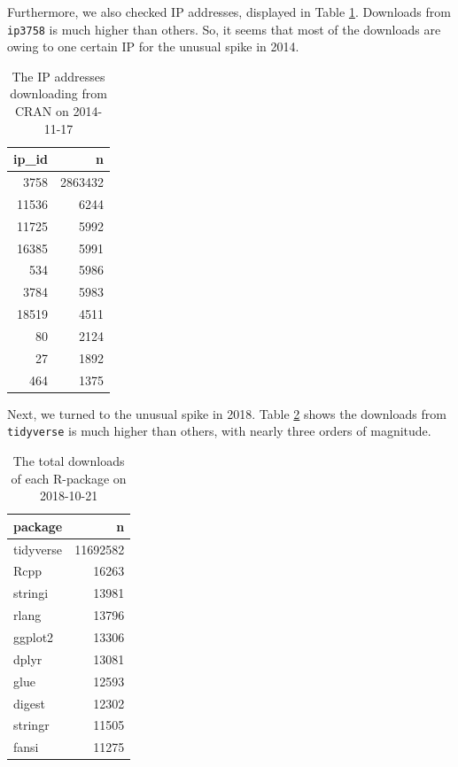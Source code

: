 \documentclass[
]{book}
\begin{document}
Furthermore, we also checked IP addresses, displayed in Table \ref{tab:spike14ip}. Downloads from \texttt{ip3758} is much higher than others. So, it seems that most of the downloads are owing to one certain IP for the unusual spike in 2014.

\begin{table}

\caption{\label{tab:spike14ip}The IP addresses downloading from CRAN on 2014-11-17}
\centering
\begin{tabular}[t]{r|r}
\hline
ip\_id & n\\
\hline
3758 & 2863432\\
\hline
11536 & 6244\\
\hline
11725 & 5992\\
\hline
16385 & 5991\\
\hline
534 & 5986\\
\hline
3784 & 5983\\
\hline
18519 & 4511\\
\hline
80 & 2124\\
\hline
27 & 1892\\
\hline
464 & 1375\\
\hline
\end{tabular}
\end{table}

Next, we turned to the unusual spike in 2018. Table \ref{tab:spike18count} shows the downloads from \texttt{tidyverse} is much higher than others, with nearly three orders of magnitude.

\begin{table}

\caption{\label{tab:spike18count}The total downloads of each R-package on 2018-10-21}
\centering
\begin{tabular}[t]{l|r}
\hline
package & n\\
\hline
tidyverse & 11692582\\
\hline
Rcpp & 16263\\
\hline
stringi & 13981\\
\hline
rlang & 13796\\
\hline
ggplot2 & 13306\\
\hline
dplyr & 13081\\
\hline
glue & 12593\\
\hline
digest & 12302\\
\hline
stringr & 11505\\
\hline
fansi & 11275\\
\hline
\end{tabular}
\end{table}
\end{document}
